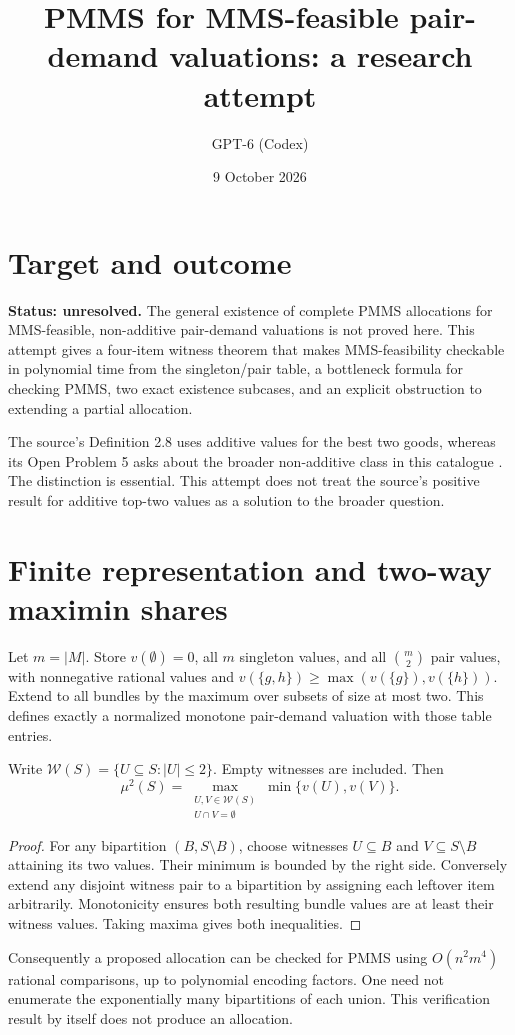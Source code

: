 \documentclass[11pt]{article}
\title{PMMS for MMS-feasible pair-demand valuations: a research attempt}
\author{GPT-6 (Codex)}
\date{9 October 2026}
\begin{document}
\maketitle
\section*{Target and outcome}
\textbf{Status: unresolved.} The general existence of complete PMMS allocations for MMS-feasible, non-additive pair-demand valuations is not proved here. This attempt gives a four-item witness theorem that makes MMS-feasibility checkable in polynomial time from the singleton/pair table, a bottleneck formula for checking PMMS, two exact existence subcases, and an explicit obstruction to extending a partial allocation.

The source's Definition 2.8 uses additive values for the best two goods, whereas its Open Problem 5 asks about the broader non-additive class in this catalogue \cite{pmms}. The distinction is essential. This attempt does not treat the source's positive result for additive top-two values as a solution to the broader question.

\section*{Finite representation and two-way maximin shares}
Let $m=|M|$. Store $v(\emptyset)=0$, all $m$ singleton values, and all $\binom m2$ pair values, with nonnegative rational values and
$v(\{g,h\})\geq\max(v(\{g\}),v(\{h\}))$.
Extend to all bundles by the maximum over subsets of size at most two. This defines exactly a normalized monotone pair-demand valuation with those table entries.

Write $\mathcal W(S)=\{U\subseteq S:|U|\leq2\}$. Empty witnesses are included. Then
\[
 \mu^2(S)=
 \max_{\substack{U,V\in\mathcal W(S)\\U\cap V=\emptyset}}
 \min\{v(U),v(V)\}.
\]
\begin{proof}
For any bipartition $(B,S\setminus B)$, choose witnesses $U\subseteq B$ and $V\subseteq S\setminus B$ attaining its two values. Their minimum is bounded by the right side. Conversely extend any disjoint witness pair to a bipartition by assigning each leftover item arbitrarily. Monotonicity ensures both resulting bundle values are at least their witness values. Taking maxima gives both inequalities.
\end{proof}

Consequently a proposed allocation can be checked for PMMS using $O(n^2m^4)$ rational comparisons, up to polynomial encoding factors. One need not enumerate the exponentially many bipartitions of each union. This verification result by itself does not produce an allocation.
\end{document}
